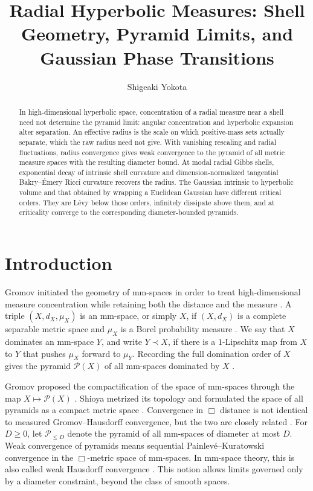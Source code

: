 \documentclass{amsart}
\title[Radial hyperbolic measures]{Radial Hyperbolic Measures: Shell Geometry, Pyramid Limits, and Gaussian Phase Transitions}
\author{Shigeaki Yokota}
\date{}
\numberwithin{equation}{section}
\theoremstyle{plain}
\theoremstyle{definition}
\theoremstyle{remark}
\newcommand{\Pyr}{\mathcal{P}}
\begin{document}
\begin{abstract}
	In high-dimensional hyperbolic space, concentration of a radial measure near a shell need not determine the pyramid limit: angular concentration and hyperbolic expansion alter separation. An effective radius is the scale on which positive-mass sets actually separate, which the raw radius need not give. With vanishing rescaling and radial fluctuations, radius convergence gives weak convergence to the pyramid of all metric measure spaces with the resulting diameter bound. At modal radial Gibbs shells, exponential decay of intrinsic shell curvature and dimension-normalized tangential Bakry--\'Emery Ricci curvature recovers the radius. The Gaussian intrinsic to hyperbolic volume and that obtained by wrapping a Euclidean Gaussian have different critical orders. They are L\'evy below those orders, infinitely dissipate above them, and at criticality converge to the corresponding diameter-bounded pyramids.
\end{abstract}

\maketitle

\section{Introduction}\label{sec:introduction}

Gromov initiated the geometry of mm-spaces in order to treat high-dimensional
measure concentration while retaining both the distance and the measure
\cite[Introduction]{shioya2016mmg}.  A triple $(X,d_X,\mu_X)$ is an mm-space,
or simply $X$, if $(X,d_X)$ is a complete separable metric space and $\mu_X$
is a Borel probability measure
\cite[Definition~2.8]{shioya2016mmg}.  We say that $X$ dominates an mm-space
$Y$, and write $Y\prec X$, if there is a $1$-Lipschitz map from $X$ to $Y$
that pushes $\mu_X$ forward to $\mu_Y$.  Recording the full domination order
of $X$ gives the pyramid $\Pyr(X)$ of all mm-spaces dominated by $X$
\cite[Definition~2.10 and Section~6.1]{shioya2016mmg}.

Gromov proposed the compactification of the space of mm-spaces through the map
$X\mapsto\Pyr(X)$ \cite{gromov2007met}.  Shioya metrized its topology and
formulated the space of all pyramids as a compact metric space
\cite[Definition~4.5 and Theorem~4.6]{shioya2022sugaku}.  Convergence in
$\Box$ distance is not identical to measured Gromov--Hausdorff convergence,
but the two are closely related \cite[Remark~4.34]{shioya2016mmg}.  For
$D\ge0$, let $\mathcal P_{\le D}$ denote the pyramid of all mm-spaces of
diameter at most $D$.  Weak convergence of pyramids means sequential
Painlev\'e--Kuratowski convergence in the $\Box$-metric space of mm-spaces.
In mm-space theory, this is also called weak Hausdorff convergence
\cite[Definition~6.4]{shioya2016mmg}.  This notion allows limits governed only
by a diameter constraint, beyond the class of smooth spaces.
\end{document}
